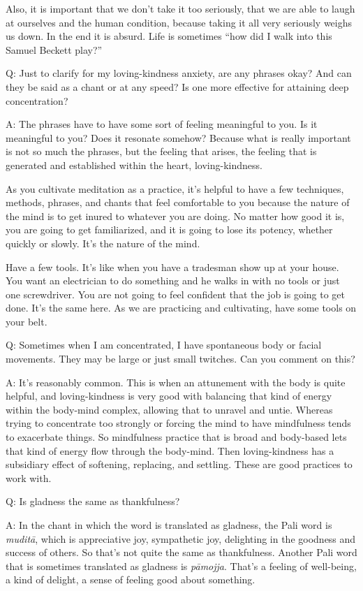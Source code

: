 Also, it is important that we don’t take it too seriously, that we are
able to laugh at ourselves and the human condition, because taking it
all very seriously weighs us down. In the end it is absurd. Life is
sometimes “how did I walk into this Samuel Beckett play?”

\qaspace
Q: Just to clarify for my loving-kindness anxiety, are any phrases okay?
And can they be said as a chant or at any speed? Is one more effective
for attaining deep concentration?

\qaspace
A: The phrases have to have some sort of feeling meaningful to you. Is
it meaningful to you? Does it resonate somehow? Because what is really
important is not so much the phrases, but the feeling that arises, the
feeling that is generated and established within the heart,
loving-kindness.

As you cultivate meditation as a practice, it’s helpful to have a few
techniques, methods, phrases, and chants that feel comfortable to you
because the nature of the mind is to get inured to whatever you are
doing. No matter how good it is, you are going to get familiarized, and
it is going to lose its potency, whether quickly or slowly. It’s the
nature of the mind.

Have a few tools. It’s like when you have a tradesman show up at your
house. You want an electrician to do something and he walks in with no
tools or just one screwdriver. You are not going to feel confident that
the job is going to get done. It’s the same here. As we are practicing
and cultivating, have some tools on your belt.

\qaspace
Q: Sometimes when I am concentrated, I have spontaneous body or facial
movements. They may be large or just small twitches. Can you comment on
this?

\qaspace
A: It’s reasonably common. This is when an attunement with the body is
quite helpful, and loving-kindness is very good with balancing that kind
of energy within the body-mind complex, allowing that to unravel and
untie. Whereas trying to concentrate too strongly or forcing the mind to
have mindfulness tends to exacerbate things. So mindfulness practice
that is broad and body-based lets that kind of energy flow through the
body-mind. Then loving-kindness has a subsidiary effect of softening,
replacing, and settling. These are good practices to work with.

\qaspace
Q: Is gladness the same as thankfulness?

\qaspace
A: In the chant in which the word is translated as gladness, the Pali
word is \emph{muditā}, which is appreciative joy, sympathetic joy,
delighting in the goodness and success of others. So that’s not quite
the same as thankfulness. Another Pali word that is sometimes translated
as gladness is \emph{pāmojja}. That’s a feeling of well-being, a kind of
delight, a sense of feeling good about something.

